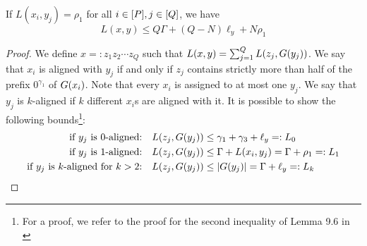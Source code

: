 \begin{lemma}
\label{lem:1-2vs1:non-ortho-upper-bound}
If $L(x_i, y_j) = \rho_1$ for all $i \in [P], j \in [Q]$, we have
\[ 
L(x,y) \leq Q\Gamma + (Q-N)\ell_y + N\rho_1
\]
\end{lemma}


\begin{proof}
%
We define $x =: z_1z_2 \cdots z_Q$ such that $L(x,y) = \sum_{j=1}^Q L(z_j, G(y_j))$.
We say that $x_i$ is aligned with $y_j$ if and only if $z_j$ contains strictly more than half of the prefix $0^{\gamma_1}$ of $G(x_i)$.
Note that every $x_i$ is assigned to at most one $y_j$.
We say that $y_j$ is $k$-aligned if $k$ different $x_i$s are aligned with it.
%
It is possible to show the following bounds\footnote{For a proof, we refer to the proof for the second inequality of Lemma 9.6 in \cite{Bringman.2018}}:%
\begin{align*}
	\text{if $y_j$ is $0$-aligned:}&& L(z_j, G(y_j)) &\leq \gamma_1 + \gamma_3 + \ell_y =: L_0 \\
	\text{if $y_j$ is $1$-aligned:}&& L(z_j, G(y_j)) &\leq \Gamma + L(x_i, y_j) = \Gamma + \rho_1 =: L_1 \\
	\text{if $y_j$ is $k$-aligned for $k>2$:}&& L(z_j, G(y_j)) &\leq |G(y_j)| = \Gamma + \ell_y =: L_k
\end{align*}



\end{proof}
